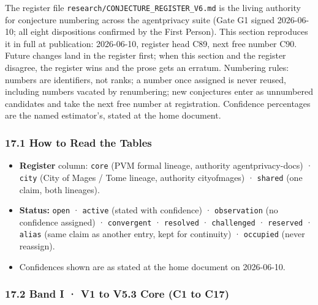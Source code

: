 \documentclass[
]{article}
\providecommand{\tightlist}{%
  \setlength{\itemsep}{0pt}\setlength{\parskip}{0pt}}
\begin{document}
The register file \texttt{research/CONJECTURE\_REGISTER\_V6.md} is the
living authority for conjecture numbering across the agentprivacy suite
(Gate G1 signed 2026-06-10; all eight dispositions confirmed by the
First Person). This section reproduces it in full at publication:
2026-06-10, register head C89, next free number C90. Future changes land
in the register first; when this section and the register disagree, the
register wins and the prose gets an erratum. Numbering rules: numbers
are identifiers, not ranks; a number once assigned is never reused,
including numbers vacated by renumbering; new conjectures enter as
unnumbered candidates and take the next free number at registration.
Confidence percentages are the named estimator's, stated at the home
document.

\subsubsection{17.1 How to Read the
Tables}\label{how-to-read-the-tables}

\begin{itemize}
\tightlist
\item
  \textbf{Register} column: \texttt{core} (PVM formal lineage, authority
  agentprivacy-docs) · \texttt{city} (City of Mages / Tome lineage,
  authority cityofmages) · \texttt{shared} (one claim, both lineages).
\item
  \textbf{Status:} \texttt{open} · \texttt{active} (stated with
  confidence) · \texttt{observation} (no confidence assigned) ·
  \texttt{convergent} · \texttt{resolved} · \texttt{challenged} ·
  \texttt{reserved} · \texttt{alias} (same claim as another entry, kept
  for continuity) · \texttt{occupied} (never reassign).
\item
  Confidences shown are as stated at the home document on 2026-06-10.
\end{itemize}

\subsubsection{17.2 Band I · V1 to V5.3 Core (C1 to
C17)}\label{band-i-v1-to-v5.3-core-c1-to-c17}
\end{document}
